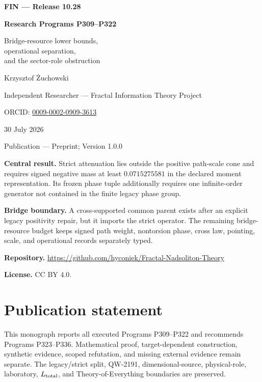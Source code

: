 \documentclass[11pt,a4paper,openany]{report}
\begin{document}
\hypersetup{pageanchor=false}
\begin{titlepage}
\centering
\vspace*{7mm}
{\Large\bfseries FIN --- Release 10.28\par}
\vspace{9mm}
{\Huge\bfseries Research Programs P309--P322\par}
\vspace{6mm}
{\Large Bridge-resource lower bounds,\\
operational separation,\\
and the sector-role obstruction\par}
\vspace{13mm}
{\Large Krzysztof \.Zuchowski\par}
\vspace{2mm}
{\normalsize Independent Researcher --- Fractal Information Theory Project\par}
\vspace{2mm}
{\normalsize ORCID:
\href{https://orcid.org/0009-0002-0909-3613}{0009-0002-0909-3613}\par}
\vspace{7mm}
{\large 30 July 2026\par}
{\normalsize Publication --- Preprint; Version 1.0.0\par}
\vfill
\begin{minipage}{0.92\textwidth}
\small
\textbf{Central result.}
Strict attenuation lies outside the positive path-scale cone and requires
signed negative mass at least \(0.0715275581\) in the declared moment
representation.  Its frozen phase tuple additionally requires one
infinite-order generator not contained in the finite legacy phase group.

\medskip
\textbf{Bridge boundary.}
A cross-supported common parent exists after an explicit legacy positivity
repair, but it imports the strict operator.  The remaining bridge-resource
budget keeps signed path weight, nontorsion phase, cross law, pointing, scale,
and operational records separately typed.

\medskip
\textbf{Repository.}
\url{https://github.com/hyconiek/Fractal-Nadsoliton-Theory}

\textbf{License.} CC BY 4.0.
\end{minipage}
\vfill
\end{titlepage}
\hypersetup{pageanchor=true}
\chapter*{Publication statement}
This monograph reports all executed Programs P309--P322 and recommends
Programs P323--P336. Mathematical proof, target-dependent construction,
synthetic evidence, scoped refutation, and missing external evidence remain
separate. The legacy/strict split, QW-2191, dimensional-source, physical-role,
laboratory, \(L_{\rm total}\), and Theory-of-Everything boundaries are
preserved.
\end{document}
